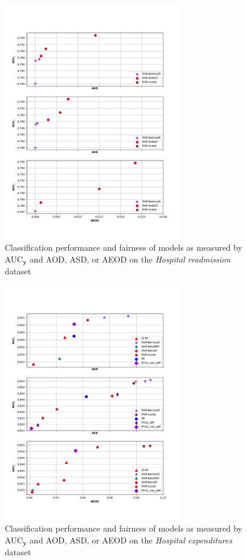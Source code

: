 \documentclass[preprint,12pt]{elsarticle}
\begin{document}
\begin{figure}
	\center
	\includegraphics[angle=0, width=0.7\textwidth]{Readmission.png}
	\captionsetup{justification=centering}
	\caption{Classification performance and fairness of models as measured by AUC$_\mathbf{y}$ and AOD, ASD, or AEOD on the \textit{Hospital readmission} dataset}
	\label{fig:Readmission1}
	\vskip -0.2in
\end{figure}

\begin{figure}
	\center
	\includegraphics[angle=0, width=0.7\textwidth]{MEPS19.png}
	\captionsetup{justification=centering}
	\caption{Classification performance and fairness of models as measured by AUC$_\mathbf{y}$ and AOD, ASD, or AEOD on the \textit{Hospital expenditures} dataset}
	\label{fig:MEPS191}
	\vskip -0.2in
\end{figure}
\end{document}
